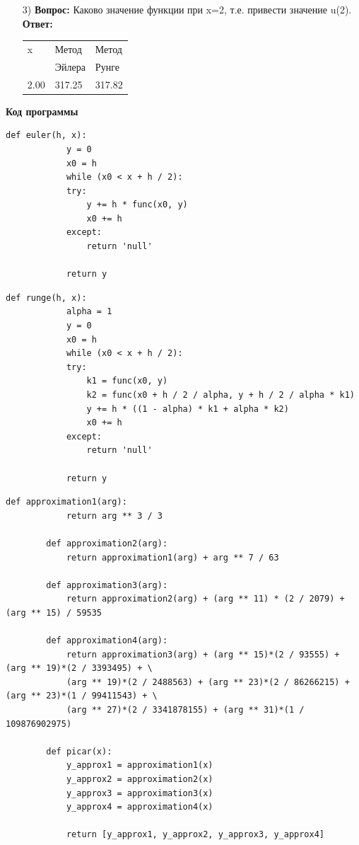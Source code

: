 \documentclass[14pt, a4paper]{extarticle}
\begin{document}
\begin{enumerate}
		
		\newpage
		\item[3)] \textbf{Вопрос:} Каково значение функции при x=2, т.е. привести значение u(2).
		\textbf{Ответ:} 
		\par
		\begin{table}[h]
			\begin{tabular}{|l|l|l|}\hline
				x    & Метод  & Метод \\
				& Эйлера  & Рунге \\ \hline
				2.00 & 317.25  & 317.82 \\
				\hline     
			\end{tabular}
		\end{table}
	\end{enumerate}
	
	\textbf{Код программы}

	\begin{lstlisting}[caption=Метод Эйлера]
		def euler(h, x):
			y = 0
			x0 = h
			while (x0 < x + h / 2):
			try:
				y += h * func(x0, y)
				x0 += h
			except:
				return 'null'
		
			return y
	\end{lstlisting}


	\begin{lstlisting}[caption=Метод Рунге-Кутта]
		def runge(h, x):
			alpha = 1
			y = 0
			x0 = h
			while (x0 < x + h / 2):
			try:
				k1 = func(x0, y)
				k2 = func(x0 + h / 2 / alpha, y + h / 2 / alpha * k1)
				y += h * ((1 - alpha) * k1 + alpha * k2)
				x0 += h
			except:
				return 'null'
			
			return y
	\end{lstlisting}

	\begin{lstlisting}[caption=Метод Пикара]
		def approximation1(arg):
			return arg ** 3 / 3
		
		def approximation2(arg):
			return approximation1(arg) + arg ** 7 / 63
		
		def approximation3(arg):
			return approximation2(arg) + (arg ** 11) * (2 / 2079) + (arg ** 15) / 59535
		
		def approximation4(arg):
			return approximation3(arg) + (arg ** 15)*(2 / 93555) + (arg ** 19)*(2 / 3393495) + \
			(arg ** 19)*(2 / 2488563) + (arg ** 23)*(2 / 86266215) + (arg ** 23)*(1 / 99411543) + \
			(arg ** 27)*(2 / 3341878155) + (arg ** 31)*(1 / 109876902975)
		
		def picar(x):
			y_approx1 = approximation1(x)
			y_approx2 = approximation2(x)
			y_approx3 = approximation3(x)
			y_approx4 = approximation4(x)
		
			return [y_approx1, y_approx2, y_approx3, y_approx4]
	\end{lstlisting}
	\newpage
	
\end{document}
